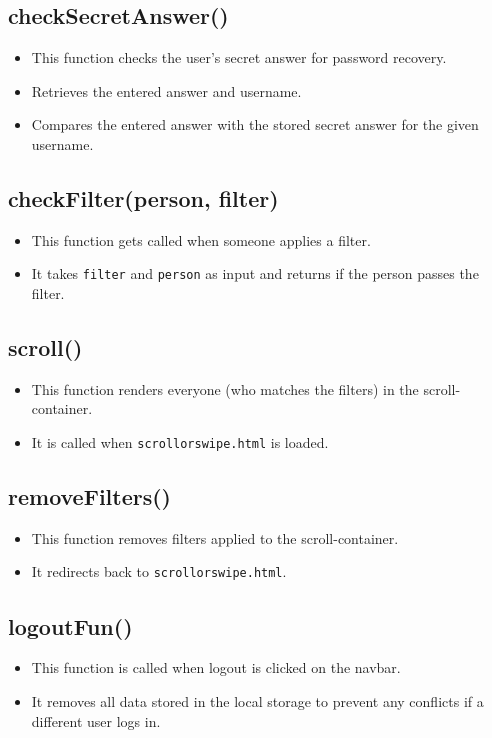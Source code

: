\documentclass[12pt,a4paper]{article}
\begin{document}
\subsection{checkSecretAnswer()}
\begin{itemize}
    \item This function checks the user's secret answer for password recovery.
    \item Retrieves the entered answer and username.
    \item Compares the entered answer with the stored secret answer for the given username.
\end{itemize}

\subsection{checkFilter(person, filter)}
\begin{itemize}
    \item This function gets called when someone applies a filter.
    \item It takes \texttt{filter} and \texttt{person} as input and returns if the person passes the filter.
\end{itemize}


\subsection{scroll()}
\begin{itemize}
    \item This function renders everyone (who matches the filters) in the scroll-container.
    \item It is called when \texttt{scroll\textunderscore or\textunderscore swipe.html} is loaded.
\end{itemize}


\subsection{removeFilters()}
\begin{itemize}
    \item This function removes filters applied to the scroll-container.
    \item It redirects back to \texttt{scroll\textunderscore or\textunderscore swipe.html}.
\end{itemize}

\subsection{logoutFun()}
\begin{itemize}
    \item This function is called when logout is clicked on the navbar.
    \item It removes all data stored in the local storage to prevent any conflicts if a different user logs in.
\end{itemize}
\end{document}
